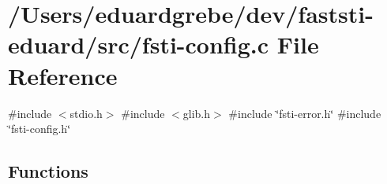 \hypertarget{fsti-config_8c}{}\section{/\+Users/eduardgrebe/dev/faststi-\/eduard/src/fsti-\/config.c File Reference}
\label{fsti-config_8c}
{\ttfamily \#include $<$stdio.\+h$>$}\newline
{\ttfamily \#include $<$glib.\+h$>$}\newline
{\ttfamily \#include \char`\"{}fsti-\/error.\+h\char`\"{}}\newline
{\ttfamily \#include \char`\"{}fsti-\/config.\+h\char`\"{}}\newline
\subsection*{Functions}
